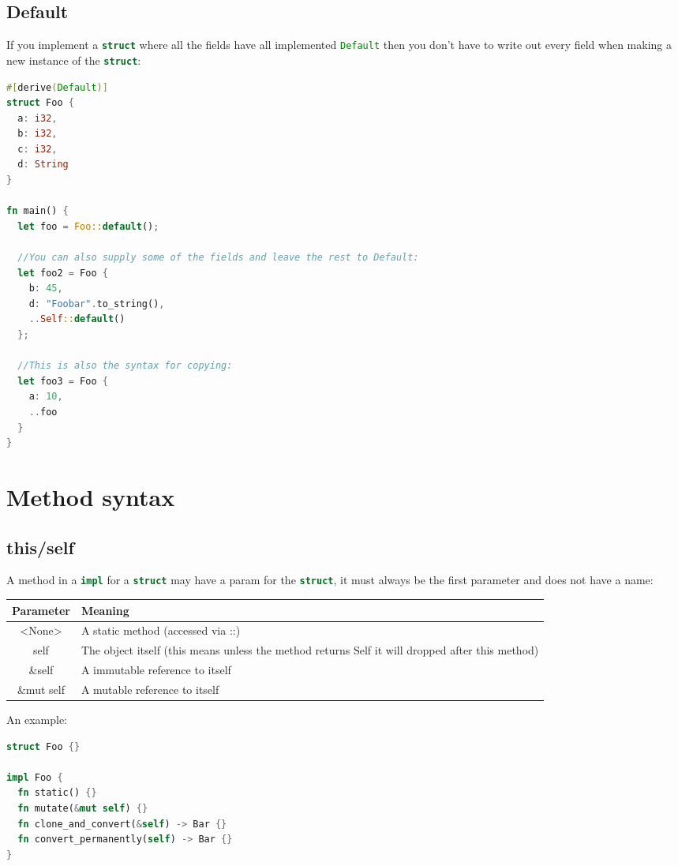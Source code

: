 \documentclass[a4paper,11pt]{article}
\begin{document}
\newpage
\subsection{Default}

If you implement a \lstinline[language=Rust]{struct} where all the fields have all implemented \lstinline[language=Rust]{Default} then you don't have to write out every field when making a new instance of the \lstinline[language=Rust]{struct}:

\begin{lstlisting}[language=Rust,frame=single]
#[derive(Default)]
struct Foo {
  a: i32,
  b: i32,
  c: i32,
  d: String
}

fn main() {
  let foo = Foo::default();

  //You can also supply some of the fields and leave the rest to Default:
  let foo2 = Foo {
    b: 45,
    d: "Foobar".to_string(),
    ..Self::default()
  };

  //This is also the syntax for copying:
  let foo3 = Foo {
    a: 10,
    ..foo
  }
}
\end{lstlisting}

\newpage
\section{Method syntax}
\subsection{this/self}

A method in a \lstinline[language=Rust]{impl} for a \lstinline[language=Rust]{struct} may have a param for the \lstinline[language=Rust]{struct}, it must always be the first parameter and does not have a name:
\begin{center}
\begin{tabular}{ |c|p{12cm}| } 
 \hline
 Parameter & Meaning \\ 
 \hline
 <None> & A static method (accessed via ::) \\
 self & The object itself (this means unless the method returns Self it will dropped after this method) \\ 
 \&self  & A immutable reference to itself \\ 
 \&mut self & A mutable reference to itself \\ 
 \hline
\end{tabular}
\end{center}

An example:
\begin{lstlisting}[language=Rust,frame=single]
struct Foo {}

impl Foo {
  fn static() {}
  fn mutate(&mut self) {}
  fn clone_and_convert(&self) -> Bar {}
  fn convert_permanently(self) -> Bar {}
}
\end{lstlisting}
\end{document}
